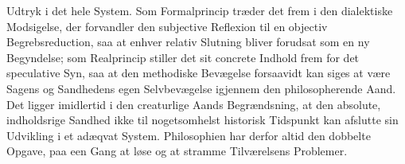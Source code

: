 \documentclass[12pt]{book}
\begin{document}
Udtryk i det hele System. Som Formalprincip træder det frem i den dialektiske Modsigelse, der
forvandler den subjective Reflexion til en objectiv Begrebsreduction, saa at enhver relativ
Slutning bliver forudsat som en ny Begyndelse; som Realprincip stiller det sit concrete Indhold
frem for det speculative Syn, saa at den methodiske Bevægelse forsaavidt kan siges at være
Sagens og Sandhedens egen Selvbevægelse igjennem den philosopherende Aand. Det ligger
imidlertid i den creaturlige Aands Begrændsning, at den absolute, indholdsrige Sandhed ikke til
nogetsomhelst historisk Tidspunkt kan afslutte sin Udvikling i et adæqvat System. Philosophien
har derfor altid den dobbelte Opgave, paa een Gang at løse og at stramme Tilværelsens
Problemer.
\end{document}
